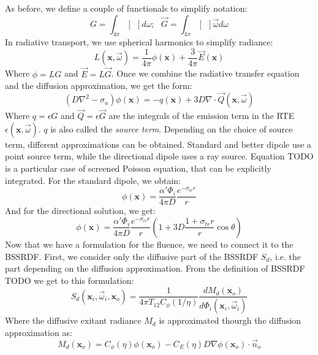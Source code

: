 As before, we define a couple of functionals to simplify notation:
\begin{equation*}
G = \int_{4\pi} [\ \ ] d\omega; \ \ \ \vec{G} = \int_{4\pi} [\ \ ] \vec{\omega} d\omega
\end{equation*}
In radiative transport, we use spherical harmonics to simplify radiance:
\begin{equation*}
L(\mathbf{x}, \vec{\omega}) = \frac{1}{4\pi}\phi(\mathbf{x}) + \frac{3}{4\pi} \vec{E}(\mathbf{x}) 
\end{equation*}
Where $\phi = L G$ and $\vec{E} = L \vec{G}$. Once we combine the radiative transfer equation and the diffusion approximation, we get the form:
\begin{equation*}
(D \nabla^2 - \sigma_a)\phi(\mathbf{x}) = -q(\mathbf{x}) + 3D \nabla \cdot \vec{Q}(\mathbf{x}, \vec{\omega})
\end{equation*}
Where $q = \epsilon G$ and $\vec{Q} = \epsilon \vec{G}$ are the integrals of the emission term in the RTE $\epsilon(\mathbf{x}, \vec{\omega})$. $q$ is also called the \emph{source term}. Depending on the choice of source term, different approximations can be obtained. Standard and better dipole use a point source term, while the directional dipole uses a ray source. Equation TODO is a particular case of screened Poisson equation, that can be explicitly integrated. For the standard dipole, we obtain:
\begin{equation*}
\phi(\mathbf{x}) = \frac{\alpha' \Phi_i}{4 \pi D} \frac{e^{-\sigma_{tr} r}}{r}
\end{equation*}
And for the directional solution, we get:
\begin{equation*}
\phi(\mathbf{x}) = \frac{\alpha' \Phi_i}{4 \pi D} \frac{e^{-\sigma_{tr} r}}{r} \left(1 + 3D \frac{1 + \sigma_{tr} r}{r} \cos\theta \right)
\end{equation*}
Now that we have a formulation for the fluence, we need to connect it to the BSSRDF. First, we consider only the diffusive part of the BSSRDF $S_d$, i.e. the part depending on the diffusion approximation. From the definition of BSSRDF TODO we get to this formulation:
\begin{equation*}
S_d(\mathbf{x}_i, \vec{\omega}_i, \mathbf{x}_o)  =  \frac{1}{4\pi T_{12}C_\phi(1/\eta)} \frac{d M_d(\mathbf{x}_o)}{d \Phi_i(\mathbf{x}_i, \vec{\omega}_i)} 
\end{equation*} 
Where the diffusive exitant radiance $M_d$ is approximated thourgh the diffusion approximation as:
\begin{equation*}
M_d(\mathbf{x}_o) =  C_\phi(\eta) \phi(\mathbf{x}_o) - C_E(\eta) D \nabla\phi(\mathbf{x}_o) \cdot \vec{n}_o
\end{equation*}
